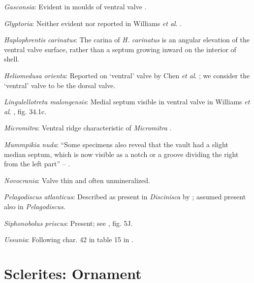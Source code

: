 \documentclass[openany]{book}
\theoremstyle{definition}
\theoremstyle{definition}
\theoremstyle{definition}
\theoremstyle{remark}
\begin{document}
\hypertarget{Gasconsia-coding-117}{}
\emph{Gasconsia}: Evident in moulds of ventral valve
\citep{Hanken1985Thetaxonomy, Watkins2002Newrecord}.

\hypertarget{Glyptoria-coding-117}{}
\emph{Glyptoria}: Neither evident nor reported in Williams \emph{et al}.
\citeyearpar{Williams2000LinguliformeaCraniiformea}.

\hypertarget{Haplophrentis_carinatus-coding-117}{}
\emph{Haplophrentis carinatus}: The carina of \emph{H. carinatus} is an
angular elevation of the ventral valve surface, rather than a septum
growing inward on the interior of shell.

\hypertarget{Heliomedusa_orienta-coding-117}{}
\emph{Heliomedusa orienta}: Reported on `ventral' valve by Chen \emph{et
al}. \citeyearpar{Chen2007Reinterpretationof}; we consider the `ventral'
valve to be the dorsal valve.

\hypertarget{Lingulellotreta_malongensis-coding-117}{}
\emph{Lingulellotreta malongensis}: Medial septum visible in ventral
valve in Williams \emph{et al}.
\citeyearpar{Williams2000LinguliformeaCraniiformea}, fig. 34.1c.

\hypertarget{Micromitra-coding-117}{}
\emph{Micromitra}: Ventral ridge characteristic of \emph{Micromitra}
\citep{Skovsted2010EarlyCambrian}.

\hypertarget{Mummpikia_nuda-coding-117}{}
\emph{Mummpikia nuda}: ``Some specimens also reveal that the vault had a
slight median septum, which is now visible as a notch or a groove
dividing the right from the left part'' --
\citet{Balthasar2008iMummpikia}.

\hypertarget{Novocrania-coding-117}{}
\emph{Novocrania}: Valve thin and often unmineralized.

\hypertarget{Pelagodiscus_atlanticus-coding-117}{}
\emph{Pelagodiscus atlanticus}: Described as present in
\emph{Discinisca} by \citet{Chen2007Reinterpretationof}; assumed present
also in \emph{Pelagodiscus}.

\hypertarget{Siphonobolus_priscus-coding-117}{}
\emph{Siphonobolus priscus}: Present; see
\citet{Popov2009Earlyontogeny}, fig. 5J.

\hypertarget{Ussunia-coding-117}{}
\emph{Ussunia}: Following char. 42 in table 15 in
\citet{Williams2000LinguliformeaCraniiformea}.

\section{Sclerites: Ornament}\label{sclerites-ornament}
\end{document}
